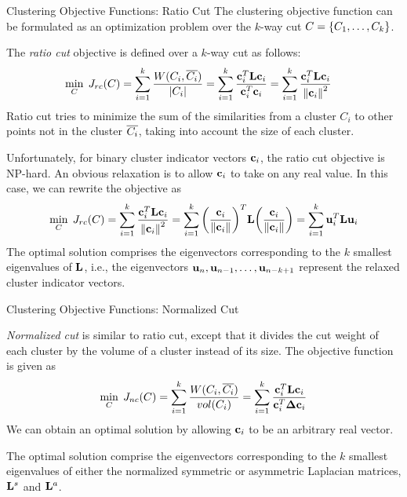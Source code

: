 \begin{frame}{Clustering Objective Functions: Ratio Cut}
The clustering objective function can be formulated as an
optimization \hbox{problem} over the $k$-way cut ${\relax C} =
\{C_1,\dots,C_k\}$. 

The {\em ratio cut} objective is def\/{i}ned
over a $k$-way cut as follows:
\begin{align*}
    \min_{\relax C} \; J_{rc}({\relax C}) & = \sum_{i=1}^k {W(C_i, \overline{C_i}) \over
    |C_i|} =  \sum_{i=1}^k {\mathbf{c}_i^T \mathbf{L} \mathbf{c}_i \over
    \mathbf{c}_i^T\mathbf{c}_i} = \sum_{i=1}^k {\mathbf{c}_i^T \mathbf{L} \mathbf{c}_i \over
    \left\lVert\mathbf{c}_i\right\rVert^2}
\end{align*}
Ratio cut tries to minimize the sum of the similarities from a
cluster $C_i$ to other points not in the cluster $\overline{C_i}$,
taking into account the size of each cluster. 


Unfortunately, for binary cluster indicator vectors $\mathbf{c}_i$, the
ratio cut objective is NP-hard. An obvious relaxation is to allow
$\mathbf{c}_i$ to take on any real value. In this case, we can rewrite
the objective as
\begin{align*}
    \min_\cC \; J_{rc}(\cC) = \sum_{i=1}^k {\bc_i^T \bL \bc_i
    \over \norm{\bc_i}^2} =
    \sum_{i=1}^k \cramped{\lB({\bc_i \over \norm{\bc_i}}\rB)^T}
        \bL
        \cramped{\lB({\bc_i \over \norm{\bc_i}}\rB)}
        =  \sum_{i=1}^k \bu_i^T \bL \bu_i
\end{align*}
The optimal solution comprises the eigenvectors corresponding to the 
$k$ smallest eigenvalues of $\mathbf{L}$, i.e., the eigenvectors
$\mathbf{u}_n, \mathbf{u}_{n-1}, \dots, \mathbf{u}_{n-k+1}$ represent the relaxed
cluster indicator vectors.
\end{frame}


\begin{frame}{Clustering Objective Functions: Normalized Cut}

{\em Normalized cut} is similar to
ratio cut, except that it divides the cut weight of each cluster
by the volume of a cluster instead of its size. The objective
function is given as
\begin{align*}
    \min_{\relax C} \; J_{nc}({\relax C}) = \sum_{i=1}^k {W(C_i, \overline{C_i}) \over
    vol(C_i)} = \sum_{i=1}^k {\mathbf{c}_i^T \mathbf{L} \mathbf{c}_i  \over
    \mathbf{c}_i^T {\bm \Delta} \mathbf{c}_i}
\end{align*}
We can obtain an optimal solution by allowing $\mathbf{c}_i$ to 
be an arbitrary real vector. 

\medskip
The optimal solution comprise the eigenvectors corresponding to the 
$k$ smallest eigenvalues of either the normalized symmetric or asymmetric
 Laplacian matrices, $\mathbf{L}^s$ and $\mathbf{L}^a$.
\end{frame}





